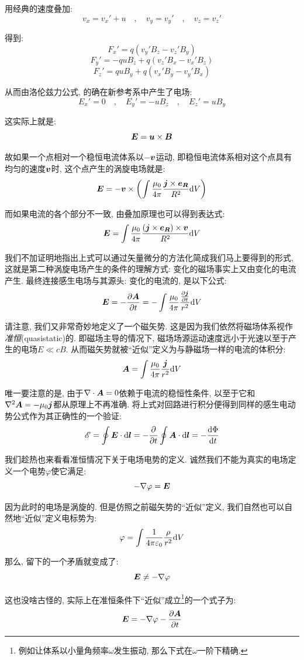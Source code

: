 用经典的速度叠加:
\[v_x=v_x'+u\quad ,\quad v_y=v_y' \quad ,\quad v_z=v_z'\]

得到:
\[F_x'=q(v_y'B_z-v_z'B_y)\]
\[F_y'=-quB_z+q(v_z'B_x-v_x'B_z)\]
\[F_z'=quB_y+q(v_x'B_y-v_y'B_x)\]

从而由洛伦兹力公式, 的确在新参考系中产生了电场:
\[E_x'=0\quad ,\quad E_y'=-uB_z\quad ,\quad E_z'=uB_y\]

这实际上就是:
\[\boldsymbol{E}=\boldsymbol{u}\times\boldsymbol{B}\]

故如果一个点相对一个稳恒电流体系以$-\boldsymbol{v}$运动, 即稳恒电流体系相对这个点具有均匀的速度$\boldsymbol{v}$时, 这个点产生的涡旋电场就是:
\[\boldsymbol{E}=-\boldsymbol{v}\times\left(\int \frac{\mu_0}{4\pi}\frac{\boldsymbol{j}\times \boldsymbol{e}_{\boldsymbol{R}}}{R^2}\textrm{d} V\right)\]

而如果电流的各个部分不一致, 由叠加原理也可以得到表达式:
\[\boldsymbol{E}=\int \frac{\mu_0}{4\pi}\frac{(\boldsymbol{j}\times \boldsymbol{e}_{\boldsymbol{R}})\times\boldsymbol{v}}{R^2}\textrm{d} V\]

我们不加证明地指出上式可以通过矢量微分的方法化简成我们马上要得到的形式, 这就是第二种涡旋电场产生的条件的理解方式: 变化的磁场事实上又由变化的电流产生. 最终连接感生电场与其源头: 变化的电流的, 是以下公式:
\[\boldsymbol{E}=-\frac{\partial \boldsymbol{A}}{\partial t}=-\int \frac{\mu_0}{4\pi}\frac{\frac{\partial \boldsymbol{j}}{\partial t}}{r^2}\textrm{d} V\]

请注意, 我们又非常奇妙地定义了一个磁矢势. 这是因为我们依然将磁场体系视作\emph{准恒}(quasistatic)的. 即磁场主导的情况下, 磁场场源运动速度远小于光速以至于产生的电场$E\ll cB$. 从而磁矢势就被``近似''定义为与静磁场一样的电流的体积分:
\[\boldsymbol{A}=\int \frac{\mu_0}{4\pi}\frac{\boldsymbol{j}}{r^2}\textrm{d} V\]

 唯一要注意的是, 由于$\nabla\cdot\boldsymbol{A}=0$依赖于电流的稳恒性条件, 以至于它和$\nabla^2\boldsymbol{A}=-\mu_0\boldsymbol{j}$都从原理上不再准确. 将上式对回路进行积分便得到同样的感生电动势公式作为其正确性的一个验证:
\[\mathscr{E}=\oint \boldsymbol{E}\cdot\textrm{d} \boldsymbol{l}=-\frac{\partial }{\partial t}\oint \boldsymbol{A}\cdot \textrm{d} \boldsymbol{l}=-\frac{\textrm{d} \Phi}{\textrm{d} t}\]

我们趁热也来看看准恒情况下关于电场电势的定义. 诚然我们不能为真实的电场定义一个电势$\varphi$使它满足:
\[-\nabla\varphi=\boldsymbol{E}\]

因为此时的电场是涡旋的. 但是仿照之前磁矢势的``近似''定义, 我们自然也可以自然地``近似''定义电标势为:
\[\varphi=\int \frac{1}{4\pi\varepsilon_0}\frac{\rho}{r^2}\textrm{d} V\]

那么, 留下的一个矛盾就变成了:
\[\boldsymbol{E}\neq -\nabla\varphi\]

这也没啥古怪的, 实际上在准恒条件下``近似''成立\footnote{例如让体系以小量角频率$\omega$发生振动, 那么下式在$\omega$一阶下精确.}的一个式子为:
\[\boldsymbol{E}=-\nabla\varphi-\frac{\partial \boldsymbol{A}}{\partial t}\]

